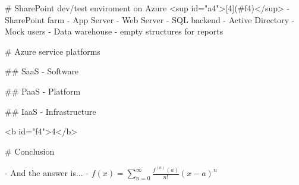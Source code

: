 
# SharePoint dev/test enviroment on Azure
<sup id="a4">[4](#f4)</sup>
- SharePoint farm
  - App Server
  - Web Server
  - SQL backend
- Active Directory
  - Mock users
- Data warehouse
  - empty structures for reports

# Azure service platforms

## SaaS - Software

## PaaS - Platform

## IaaS - Infrastructure

<b id="f4">4</b>

# Conclusion

- And the answer is...
- $f(x)=\sum_{n=0}^\infty\frac{f^{(n)}(a)}{n!}(x-a)^n$


